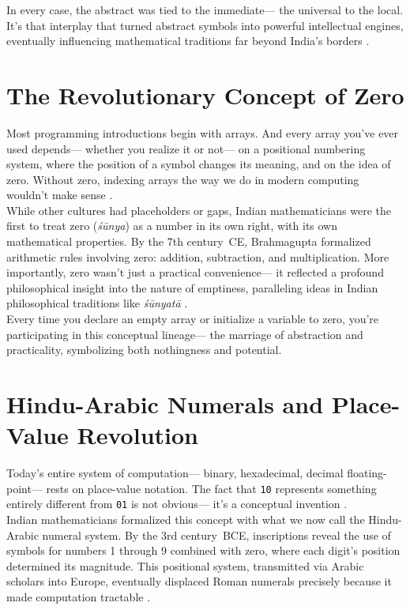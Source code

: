 In every case, the abstract was tied to the immediate---%
the universal to the local. It’s that interplay that turned abstract symbols into powerful intellectual engines, eventually influencing mathematical traditions far beyond India’s borders \cite{mj_college}.

\section{The Revolutionary Concept of Zero}
Most programming introductions begin with arrays. And every array you’ve ever used depends---%
whether you realize it or not---%
on a positional numbering system, where the position of a symbol changes its meaning, and on the idea of zero. Without zero, indexing arrays the way we do in modern computing wouldn’t make sense \cite{wiki_indian_math}.\\

While other cultures had placeholders or gaps, Indian mathematicians were the first to treat zero (\emph{śūnya}) as a number in its own right, with its own mathematical properties. By the 7th century~CE, Brahmagupta formalized arithmetic rules involving zero: addition, subtraction, and multiplication. More importantly, zero wasn’t just a practical convenience---%
it reflected a profound philosophical insight into the nature of emptiness, paralleling ideas in Indian philosophical traditions like \emph{śūnyatā} \cite{vajiram_ravi,mj_college}.\\

Every time you declare an empty array or initialize a variable to zero, you’re participating in this conceptual lineage---%
the marriage of abstraction and practicality, symbolizing both nothingness and potential.

\section{Hindu-Arabic Numerals and Place-Value Revolution}
Today’s entire system of computation---%
binary, hexadecimal, decimal floating-point---%
rests on place-value notation. The fact that \texttt{10} represents something entirely different from \texttt{01} is not obvious---%
it’s a conceptual invention \cite{ukessays_indian_math}.\\

Indian mathematicians formalized this concept with what we now call the Hindu-Arabic numeral system. By the 3rd century~BCE, inscriptions reveal the use of symbols for numbers 1 through 9 combined with zero, where each digit’s position determined its magnitude. This positional system, transmitted via Arabic scholars into Europe, eventually displaced Roman numerals precisely because it made computation tractable \cite{wiki_indian_math}.\\

